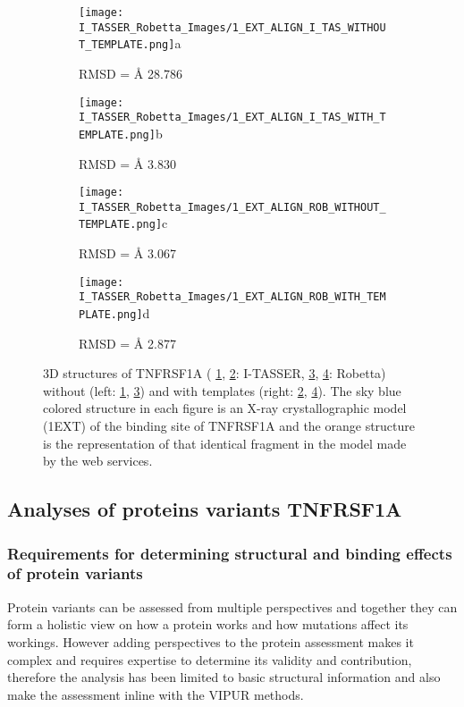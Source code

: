	\begin{figure}[!ht]
		\centering
		\begin{subfigure}{0.45\textwidth}
			\texttt{[image: I\_TASSER\_Robetta\_Images/1\_EXT\_ALIGN\_I\_TAS\_WITHOUT\_TEMPLATE.png]}{a}
			\caption{RMSD = {\AA} 28.786}
			\label{fig:RES_I_TASSER_Without}
		\end{subfigure}
		\begin{subfigure}{0.45\textwidth}
			\texttt{[image: I\_TASSER\_Robetta\_Images/1\_EXT\_ALIGN\_I\_TAS\_WITH\_TEMPLATE.png]}{b}
			\caption{RMSD = {\AA} 3.830}
			\label{fig:RES_I_TASSER_With}
		\end{subfigure}
		\begin{subfigure}{0.45\textwidth}
			\texttt{[image: I\_TASSER\_Robetta\_Images/1\_EXT\_ALIGN\_ROB\_WITHOUT\_TEMPLATE.png]}{c}
			\caption{RMSD =  {\AA} 3.067}
			\label{fig:RES_Robetta_Without}
		\end{subfigure}
		\begin{subfigure}{0.45\textwidth}
			\texttt{[image: I\_TASSER\_Robetta\_Images/1\_EXT\_ALIGN\_ROB\_WITH\_TEMPLATE.png]}{d}
			\caption{RMSD =  {\AA} 2.877}
			\label{fig:RES_Robetta_With}
		\end{subfigure}
		\caption[I-TASSER and Robetta models with and without templates]{3D structures of TNFRSF1A ( \ref{fig:RES_I_TASSER_Without}, \ref{fig:RES_I_TASSER_With}: I-TASSER, \ref{fig:RES_Robetta_Without}, \ref{fig:RES_Robetta_With}: Robetta) without (left: \ref{fig:RES_I_TASSER_Without}, \ref{fig:RES_Robetta_Without}) and with templates (right: \ref{fig:RES_I_TASSER_With}, \ref{fig:RES_Robetta_With}). The sky blue colored structure in each figure is an X-ray crystallographic model (1EXT) of the binding site of TNFRSF1A and the orange structure is the representation of that identical fragment in the model made by the web services.}
		\label{fig:I_Tasser_Robetta_models}
	\end{figure}
	\label{subsubsec:RES_Expanding_Models}

\newpage
\subsection{Analyses of proteins variants TNFRSF1A}
	\subsubsection{Requirements for determining structural and binding effects of protein variants}
	Protein variants can be assessed from multiple perspectives and together they can form a holistic view on how a protein works and how mutations affect its workings. However adding perspectives to the protein assessment makes it complex and requires expertise to determine its validity and contribution, therefore the analysis has been limited to basic structural information and also make the assessment inline with the VIPUR methods.
	
